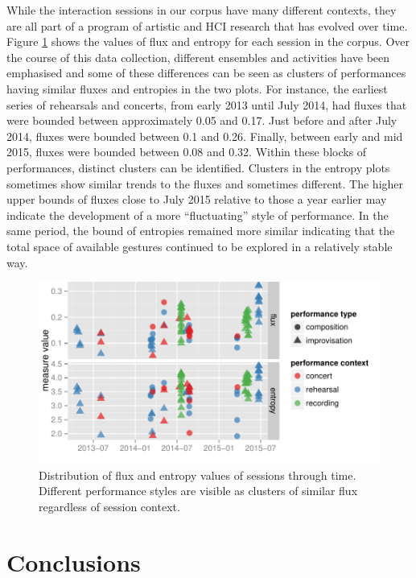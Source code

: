 \documentclass{sigchi}
\begin{document}
While the interaction sessions in our corpus have many different
contexts, they are all part of a program of artistic and HCI research
that has evolved over time. Figure \ref{fig:flux-entropy-through-time}
shows the values of flux and entropy for each session in the corpus.
Over the course of this data collection, different ensembles and
activities have been emphasised and some of these differences can be
seen as clusters of performances having similar fluxes and entropies in the
two plots. For instance, the earliest series of rehearsals and
concerts, from early 2013 until July 2014, 
had fluxes that were bounded between approximately 0.05 and 0.17.
Just before and after July 2014, fluxes were bounded between 0.1 and 0.26. Finally,
between early and mid 2015, fluxes were bounded between 0.08 and 0.32. Within these 
blocks of performances, distinct clusters can be identified. Clusters in the entropy plots
sometimes show similar trends to the fluxes and sometimes different. The higher
upper bounds of fluxes close to July 2015 relative to those a year earlier may indicate
the development of a more ``fluctuating'' style of performance. In the same period, the bound
of entropies remained more similar indicating that the total space of available gestures continued
to be explored in a relatively stable way. 

\begin{figure}
  \centering
  \includegraphics[width=\linewidth]{figures/flux-entropy-through-time}
  \caption{Distribution of flux and entropy values of sessions through time.
    Different performance styles are visible as clusters of similar
    flux regardless of session context.
    \label{fig:flux-entropy-through-time}}
\end{figure}

\section{Conclusions}
\end{document}
